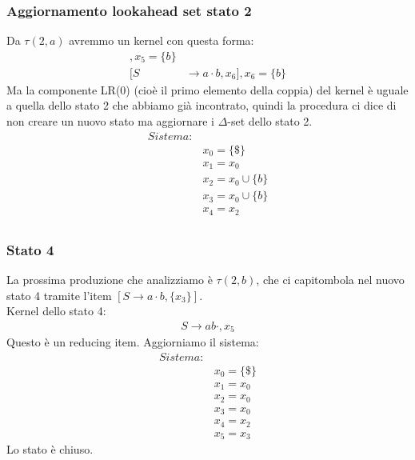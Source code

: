 \documentclass[class=book, crop=false, oneside, 12pt]{standalone}
\begin{document}
\subsubsection*{Aggiornamento lookahead set stato 2}
Da \(\tau(2,a)\) avremmo un kernel con questa forma:
\begin{align*}
    [S &\to a \cdot S b, x_5], x_5=\{b\} \\
    [S &\to a \cdot b, x_6], x_6=\{b\}
\end{align*}
Ma la componente LR(0) (cioè il primo elemento della coppia) del kernel è uguale a quella dello stato 2 che abbiamo già incontrato, quindi la procedura ci dice di non creare un nuovo stato ma aggiornare i \(\Delta\)-set dello stato 2.
\begin{align*}
    Sistema:& \\
            & x_0 = \{\$\}\\
            & x_1 = x_0 \\
            & x_2 = x_0 \cup \{b\} \\
            & x_3 = x_0 \cup \{b\} \\
            & x_4 = x_2 \\
\end{align*}
\subsubsection*{Stato 4}
La prossima produzione che analizziamo è  \(\tau(2,b)\), che ci capitombola nel nuovo stato 4 tramite l'item \([S \to a \cdot b, \{x_3\}]\).
\\
Kernel dello stato 4:
\begin{align*}
    S \to  a b \cdot, x_5
\end{align*}
Questo è un reducing item.
Aggiorniamo il sistema:
\begin{align*}
    Sistema:& \\
            & x_0 = \{\$\}\\
            & x_1 = x_0 \\
            & x_2 = x_0 \\
            & x_3 = x_0 \\
            & x_4 = x_2 \\
            & x_5 = x_3 
\end{align*}
Lo stato è chiuso.
\end{document}
